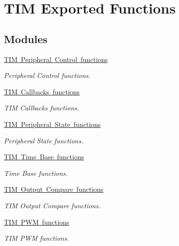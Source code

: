 \hypertarget{group___t_i_m___exported___functions}{}\section{T\+IM Exported Functions}
\label{group___t_i_m___exported___functions}
\subsection*{Modules}
\begin{DoxyCompactItemize}
\item 
\mbox{\hyperlink{group___t_i_m___exported___functions___group8}{T\+I\+M Peripheral Control functions}}
\begin{DoxyCompactList}\small\item\em Peripheral Control functions. \end{DoxyCompactList}\item 
\mbox{\hyperlink{group___t_i_m___exported___functions___group9}{T\+I\+M Callbacks functions}}
\begin{DoxyCompactList}\small\item\em T\+IM Callbacks functions. \end{DoxyCompactList}\item 
\mbox{\hyperlink{group___t_i_m___exported___functions___group10}{T\+I\+M Peripheral State functions}}
\begin{DoxyCompactList}\small\item\em Peripheral State functions. \end{DoxyCompactList}\item 
\mbox{\hyperlink{group___t_i_m___exported___functions___group1}{T\+I\+M Time Base functions}}
\begin{DoxyCompactList}\small\item\em Time Base functions. \end{DoxyCompactList}\item 
\mbox{\hyperlink{group___t_i_m___exported___functions___group2}{T\+I\+M Output Compare functions}}
\begin{DoxyCompactList}\small\item\em T\+IM Output Compare functions. \end{DoxyCompactList}\item 
\mbox{\hyperlink{group___t_i_m___exported___functions___group3}{T\+I\+M P\+W\+M functions}}
\begin{DoxyCompactList}\small\item\em T\+IM P\+WM functions. \end{DoxyCompactList}\item 

\end{DoxyCompactItemize}
